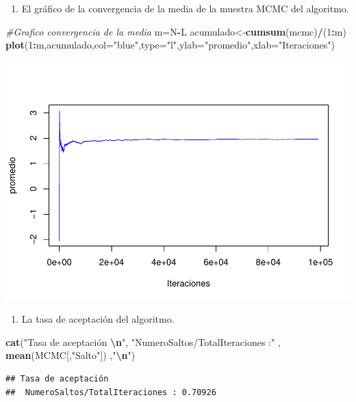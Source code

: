 \documentclass[
]{article}
\newenvironment{Shaded}{\begin{snugshade}}{\end{snugshade}}
\newcommand{\AttributeTok}[1]{\textcolor[rgb]{0.13,0.29,0.53}{#1}}
\newcommand{\CommentTok}[1]{\textcolor[rgb]{0.56,0.35,0.01}{\textit{#1}}}
\newcommand{\DecValTok}[1]{\textcolor[rgb]{0.00,0.00,0.81}{#1}}
\newcommand{\FunctionTok}[1]{\textcolor[rgb]{0.13,0.29,0.53}{\textbf{#1}}}
\newcommand{\NormalTok}[1]{#1}
\newcommand{\OtherTok}[1]{\textcolor[rgb]{0.56,0.35,0.01}{#1}}
\newcommand{\SpecialCharTok}[1]{\textcolor[rgb]{0.81,0.36,0.00}{\textbf{#1}}}
\newcommand{\StringTok}[1]{\textcolor[rgb]{0.31,0.60,0.02}{#1}}
\providecommand{\tightlist}{%
  \setlength{\itemsep}{0pt}\setlength{\parskip}{0pt}}
\begin{document}
\begin{enumerate}
\def\labelenumi{\alph{enumi}.}
\setcounter{enumi}{5}
\tightlist
\item
  El gráfico de la convergencia de la media de la muestra MCMC del
  algoritmo.
\end{enumerate}

\begin{Shaded}
\begin{Highlighting}[]
\CommentTok{\#Grafico convergencia de la media}
\NormalTok{m}\OtherTok{=}\NormalTok{N}\SpecialCharTok{{-}}\NormalTok{L}
\NormalTok{acumulado}\OtherTok{\textless{}{-}}\FunctionTok{cumsum}\NormalTok{(mcmc)}\SpecialCharTok{/}\NormalTok{(}\DecValTok{1}\SpecialCharTok{:}\NormalTok{m)}
\FunctionTok{plot}\NormalTok{(}\DecValTok{1}\SpecialCharTok{:}\NormalTok{m,acumulado,}\AttributeTok{col=}\StringTok{"blue"}\NormalTok{,}\AttributeTok{type=}\StringTok{"l"}\NormalTok{,}\AttributeTok{ylab=}\StringTok{"promedio"}\NormalTok{,}\AttributeTok{xlab=}\StringTok{"Iteraciones"}\NormalTok{)}
\end{Highlighting}
\end{Shaded}

\includegraphics{tarea2_files/figure-latex/unnamed-chunk-17-1.pdf}

\begin{enumerate}
\def\labelenumi{\alph{enumi}.}
\setcounter{enumi}{6}
\tightlist
\item
  La tasa de aceptación del algoritmo.
\end{enumerate}

\begin{Shaded}
\begin{Highlighting}[]
\FunctionTok{cat}\NormalTok{(}\StringTok{"Tasa de aceptación }\SpecialCharTok{\textbackslash{}n}\StringTok{"}\NormalTok{,}
    \StringTok{"NumeroSaltos/TotalIteraciones :"}\NormalTok{ , }\FunctionTok{mean}\NormalTok{(MCMC[,}\StringTok{"Salto"}\NormalTok{]) ,}\StringTok{"}\SpecialCharTok{\textbackslash{}n}\StringTok{"}\NormalTok{)}
\end{Highlighting}
\end{Shaded}

\begin{verbatim}
## Tasa de aceptación 
##  NumeroSaltos/TotalIteraciones : 0.70926
\end{verbatim}
\end{document}
